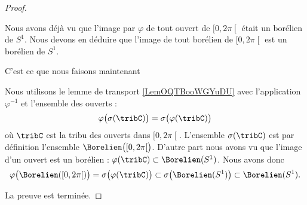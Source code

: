 \begin{proof}
\begin{subproof}
		\spitem[Pause]
		Nous avons déjà vu que l'image par \( \varphi\) de tout ouvert de \( \mathopen[ 0 , 2\pi \mathclose[\) était un borélien de \( S^1\). Nous devons en déduire que l'image de tout borélien de \( \mathopen[ 0 , 2\pi \mathclose[\) est un borélien de \( S^1\).

		C'est ce que nous faisons maintenant

		\spitem[Boréliens]
		Nous utilisons le lemme de transport \ref{LemOQTBooWGYuDU} avec l'application \( \varphi^{-1}\) et l'ensemble des ouverts :
		\begin{equation}
			\varphi\big( \sigma(\tribC) \big)=\sigma\big( \varphi(\tribC) \big)
		\end{equation}
		où \( \tribC\) est la tribu des ouverts dans \( \mathopen[ 0 , 2\pi \mathclose[\). L'ensemble \( \sigma(\tribC)\) est par définition l'ensemble \( \Borelien\big( \mathopen[ 0 , 2\pi \mathclose[ \big)\). D'autre part nous avons vu que l'image d'un ouvert est un borélien : \( \varphi(\tribC)\subset\Borelien(S^1)\). Nous avons donc
		\begin{equation}
			\varphi\big( \Borelien(\mathopen[ 0 , 2\pi \mathclose[) \big)=\sigma\big( \varphi(\tribC) \big)\subset\sigma\big( \Borelien(S^1) \big)\subset\Borelien(S^1).
		\end{equation}
	\end{subproof}
	La preuve est terminée.
\end{proof}

